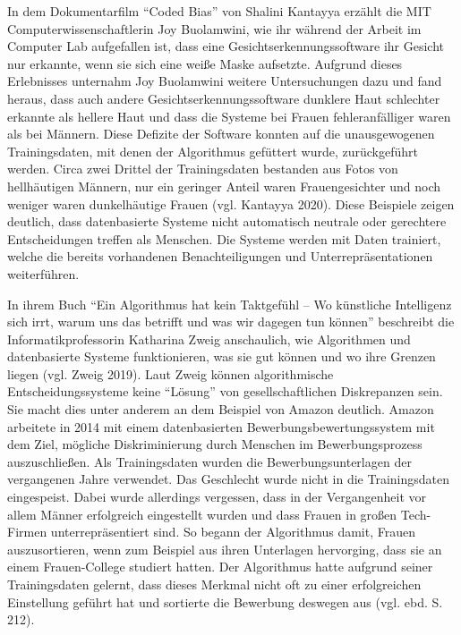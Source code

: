 \documentclass[a4paper,
fontsize=11pt,
oneside,
numbers=noperiodatend,
parskip=half-,
bibliography=totoc,
final
]{scrartcl}
\begin{document}
In dem Dokumentarfilm \enquote{Coded Bias} von Shalini Kantayya erzählt
die MIT Computerwissenschaftlerin Joy Buolamwini, wie ihr während der
Arbeit im Computer Lab aufgefallen ist, dass eine
Gesichtserkennungssoftware ihr Gesicht nur erkannte, wenn sie sich eine
weiße Maske aufsetzte. Aufgrund dieses Erlebnisses unternahm Joy
Buolamwini weitere Untersuchungen dazu und fand heraus, dass auch andere
Gesichtserkennungssoftware dunklere Haut schlechter erkannte als hellere
Haut und dass die Systeme bei Frauen fehleranfälliger waren als bei
Männern. Diese Defizite der Software konnten auf die unausgewogenen
Trainingsdaten, mit denen der Algorithmus gefüttert wurde, zurückgeführt
werden. Circa zwei Drittel der Trainingsdaten bestanden aus Fotos von
hellhäutigen Männern, nur ein geringer Anteil waren Frauengesichter und
noch weniger waren dunkelhäutige Frauen (vgl. Kantayya 2020). Diese
Beispiele zeigen deutlich, dass datenbasierte Systeme nicht automatisch
neutrale oder gerechtere Entscheidungen treffen als Menschen. Die
Systeme werden mit Daten trainiert, welche die bereits vorhandenen
Benachteiligungen und Unterrepräsentationen weiterführen.

In ihrem Buch \enquote{Ein Algorithmus hat kein Taktgefühl -- Wo
künstliche Intelligenz sich irrt, warum uns das betrifft und was wir
dagegen tun können} beschreibt die Informatikprofessorin Katharina Zweig
anschaulich, wie Algorithmen und datenbasierte Systeme funktionieren,
was sie gut können und wo ihre Grenzen liegen (vgl. Zweig 2019). Laut
Zweig können algorithmische Entscheidungssysteme keine \enquote{Lösung}
von gesellschaftlichen Diskrepanzen sein. Sie macht dies unter anderem
an dem Beispiel von Amazon deutlich. Amazon arbeitete in 2014 mit einem
datenbasierten Bewerbungsbewertungssystem mit dem Ziel, mögliche
Diskriminierung durch Menschen im Bewerbungsprozess auszuschließen. Als
Trainingsdaten wurden die Bewerbungsunterlagen der vergangenen Jahre
verwendet. Das Geschlecht wurde nicht in die Trainingsdaten eingespeist.
Dabei wurde allerdings vergessen, dass in der Vergangenheit vor allem
Männer erfolgreich eingestellt wurden und dass Frauen in großen
Tech-Firmen unterrepräsentiert sind. So begann der Algorithmus damit,
Frauen auszusortieren, wenn zum Beispiel aus ihren Unterlagen
hervorging, dass sie an einem Frauen-College studiert hatten. Der
Algorithmus hatte aufgrund seiner Trainingsdaten gelernt, dass dieses
Merkmal nicht oft zu einer erfolgreichen Einstellung geführt hat und
sortierte die Bewerbung deswegen aus (vgl. ebd. S. 212).
\end{document}
